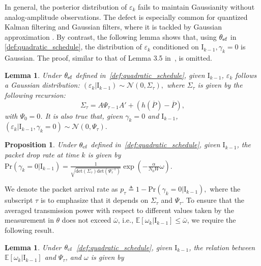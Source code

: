 \documentclass[twocolumn]{autart}    \usepackage{cite}
\newtheorem{lemma}[theorem]{Lemma}
\newtheorem{proposition}[theorem]{Proposition}
\begin{document}
{{In general, the posterior distribution of $\varepsilon_k$ fails to maintain Gaussianity without
analog-amplitude observations. The defect is
especially common for quantized Kalman filtering and Gaussian filters, where
it is tackled by Gaussian approximation \cite{andmoo79,kotecha2003gaussian,soi-kf-tsp06}.
By contrast,
the following lemma shows that,
using $\theta_{\rm ef}$ in \eqref{def:quadratic_schedule},
the distribution of $\varepsilon_k$ conditioned on
$\mathrm{I}_{k-1},\gamma_k=0$
is Gaussian. The proof, similar to that of Lemma 3.5 in~\cite{Liyuzhe13CDC}, is omitted.
\begin{lemma} \label{lemma:still-gaussian}
Under $\theta_{\rm ef}$ defined in~\eqref{def:quadratic_schedule}, given $\mathrm{I}_{k-1}$,
$\varepsilon_{k}$ follows a Gaussian distribution:
$ (\varepsilon_k|
  {\mathrm{I}_{k-1}}) \sim \mathcal
  N(0, {\Sigma_\tau}),$
where $\Sigma_\tau$ is given by the following recursion:
\begin{equation}\label{eqn:evolution_sigma_psi}
\Sigma_\tau=A\Psi_
{\tau-1}A'+\left(h(\overline{P})-\overline{P}\right),
\end{equation}
with $\Psi_0=0$. It is also true that, given
$\gamma_k=0$ and $\mathrm{I}_{k-1}$,
$
  (\varepsilon_k|{\mathrm{I}_{k-1}},\gamma_k=0)
  \sim \mathcal N(0, {\Psi_\tau}).
$
\end{lemma}
\begin{proposition} \label{lemma:communication_rate}
Under $\theta_{\rm ef}$ defined in~\eqref{def:quadratic_schedule}, given $\mathrm{I}_{k-1}$,
the packet drop rate at time $k$ is given by $\mathrm{Pr}(\gamma_k=0|\mathrm{I}_{k-1})=\frac{1}{\sqrt{\mathrm{det}(\Sigma_\tau)
 \mathrm{det}(\Psi_\tau^{-1})}}
 \exp\left(-\frac{\alpha}{N_0W}\omega\right).$
\end{proposition}
We denote the packet arrival rate
as $p_\tau\triangleq1-\mathrm{Pr}(\gamma_k=0|\mathrm{I}_{k-1}),$ where
the subscript $\tau$ is to
emphasize that it depends on $\Sigma_\tau$ and $\Psi_\tau$.
To ensure that the averaged transmission power with respect to different values
taken by the measurement in $\theta$ does not exceed
$\bar \omega$, i.e.,
$\mathbb{E}[\omega_k|\mathrm{I}_{k-1}]\leq \bar\omega$, we require the following result.
\begin{lemma} \label{lemma:energy beta}
Under $\theta_{\rm ef}$~\eqref{def:quadratic_schedule}, given $\mathrm{I}_{k-1}$, the relation between $\mathbb E[\omega_k|\mathrm{I}_{k-1}]$ and $\Psi_\tau$, and $\omega$ is given by
\begin{equation}\label{eqn:expected-power}

\end{equation}
\end{lemma}}}
\end{document}
